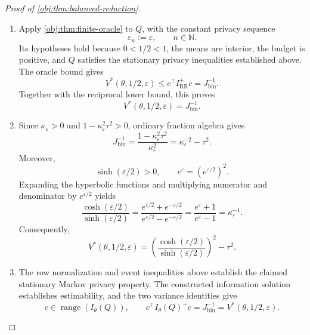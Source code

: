 \documentclass[11pt]{article}
\begin{document}
\begin{proof}[Proof of \cref{obj:thm:balanced-reduction}]
\begin{enumerate}
\item Apply \cref{obj:thm:finite-oracle} to \(Q\), with the constant privacy
sequence
\[
\varepsilon_n:=\varepsilon,
\qquad n\in\mathbb N.
\]
Its hypotheses hold because \(0<1/2<1\), the means are interior, the
budget is positive, and \(Q\) satisfies the stationary privacy
inequalities established above. The oracle bound gives
\[
V^*(\theta,1/2,\varepsilon)
\le c^\top I_{\mathrm{RR}}^+c
=J_{\mathrm{bin}}^{-1}.
\]
Together with the reciprocal lower bound, this proves
\[
V^*(\theta,1/2,\varepsilon)
=J_{\mathrm{bin}}^{-1}.
\]

\item Since \(\kappa_\varepsilon>0\) and
\(1-\kappa_\varepsilon^2\tau^2>0\), ordinary fraction algebra gives
\[
J_{\mathrm{bin}}^{-1}
=
\frac{1-\kappa_\varepsilon^2\tau^2}{\kappa_\varepsilon^2}
=\kappa_\varepsilon^{-2}-\tau^2.
\]
Moreover,
\[
\sinh(\varepsilon/2)>0,
\qquad
e^\varepsilon=(e^{\varepsilon/2})^2.
\]
Expanding the hyperbolic functions and multiplying numerator and
denominator by \(e^{\varepsilon/2}\) yields
\[
\frac{\cosh(\varepsilon/2)}{\sinh(\varepsilon/2)}
=
\frac{e^{\varepsilon/2}+e^{-\varepsilon/2}}
{e^{\varepsilon/2}-e^{-\varepsilon/2}}
=
\frac{e^\varepsilon+1}{e^\varepsilon-1}
=\kappa_\varepsilon^{-1}.
\]
Consequently,
\[
V^*(\theta,1/2,\varepsilon)
=
\left(\frac{\cosh(\varepsilon/2)}{\sinh(\varepsilon/2)}\right)^2
-\tau^2.
\]

\item The row normalization and event inequalities above establish the
claimed stationary Markov privacy property. The constructed information
solution establishes estimability, and the two variance identities give
\[
c\in\operatorname{range}(I_\theta(Q)),
\qquad
c^\top I_\theta(Q)^+c
=J_{\mathrm{bin}}^{-1}
=V^*(\theta,1/2,\varepsilon).
\]
\end{enumerate}
\end{proof}
\end{document}
